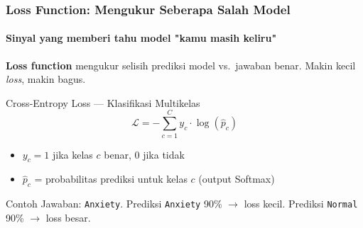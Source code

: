 \documentclass[t,aspectratio=169,xcolor=dvipsnames]{beamer}
\begin{document}
\begin{frame}
    \frametitle{Loss Function: Mengukur Seberapa Salah Model}
    \framesubtitle{Sinyal yang memberi tahu model "kamu masih keliru"}
    \small
    \textbf{Loss function} mengukur selisih prediksi model vs.~jawaban benar.
    Makin kecil \textit{loss}, makin bagus.

    \begin{exampleblock}{Cross-Entropy Loss — Klasifikasi Multikelas}
        \[
            \mathcal{L} = -\sum_{c=1}^{C} y_c \cdot \log(\hat{p}_c)
        \]
        \footnotesize
        \begin{itemize}
            \item $y_c = 1$ jika kelas $c$ benar, 0 jika tidak
            \item $\hat{p}_c$ = probabilitas prediksi untuk kelas $c$ (output Softmax)
        \end{itemize}
    \end{exampleblock}

    \vspace{0.15em}
    \begin{alertblock}{Contoh}
        \footnotesize Jawaban: \texttt{Anxiety}. Prediksi \texttt{Anxiety} 90\% $\rightarrow$ loss kecil. Prediksi \texttt{Normal} 90\% $\rightarrow$ loss besar.
    \end{alertblock}
\end{frame}
\end{document}
